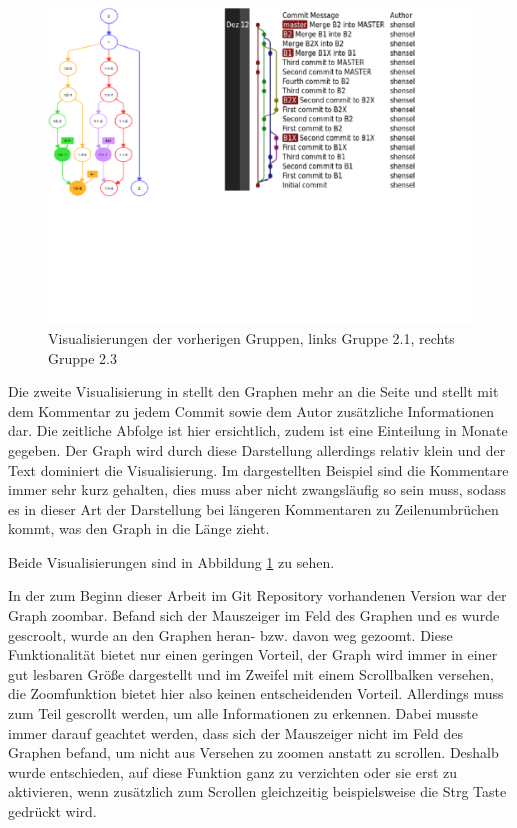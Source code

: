 \documentclass[nocolor]{tudbook}
\begin{document}
\begin{figure}[htbp] 
  \centering
     \includegraphics[width=1.2\textwidth]{Vorarbeiten.png}
  \caption[Visualisierungen der vorherigen Gruppen, links Gruppe 2.1 (aus \cite{Gruppe2.1}), rechts Gruppe 2.3 (aus \cite{Gruppe2.3})]{Visualisierungen der vorherigen Gruppen, links Gruppe 2.1, rechts Gruppe 2.3}
  \label{fig:Vorarbeiten}
\end{figure}

Die zweite Visualisierung in \cite{Gruppe2.3} stellt den Graphen mehr an die Seite und stellt mit dem Kommentar zu jedem Commit sowie dem Autor zusätzliche Informationen dar. Die zeitliche Abfolge ist hier ersichtlich, zudem ist eine Einteilung in Monate gegeben. Der Graph wird durch diese Darstellung allerdings relativ klein und der Text dominiert die Visualisierung. Im dargestellten Beispiel sind die Kommentare immer sehr kurz gehalten, dies muss aber nicht zwangsläufig so sein muss, sodass es in dieser Art der Darstellung bei längeren Kommentaren zu Zeilenumbrüchen kommt, was den Graph in die Länge zieht.  

Beide Visualisierungen sind in Abbildung \ref{fig:Vorarbeiten} zu sehen.

In der zum Beginn dieser Arbeit im Git Repository vorhandenen Version war der Graph zoombar. Befand sich der Mauszeiger im Feld des Graphen und es wurde gescroolt, wurde an den Graphen heran- bzw. davon weg gezoomt. Diese Funktionalität bietet nur einen geringen Vorteil, der Graph wird immer in einer gut lesbaren Größe dargestellt und im Zweifel mit einem Scrollbalken versehen, die Zoomfunktion bietet hier also keinen entscheidenden Vorteil. Allerdings muss zum Teil gescrollt werden, um alle Informationen zu erkennen. Dabei musste immer darauf geachtet werden, dass sich der Mauszeiger nicht im Feld des Graphen befand, um nicht aus Versehen zu zoomen anstatt zu scrollen. Deshalb wurde entschieden, auf diese Funktion ganz zu verzichten oder sie erst zu aktivieren, wenn zusätzlich zum Scrollen gleichzeitig beispielsweise die \glqq Strg\grqq{} Taste gedrückt wird.
\end{document}
